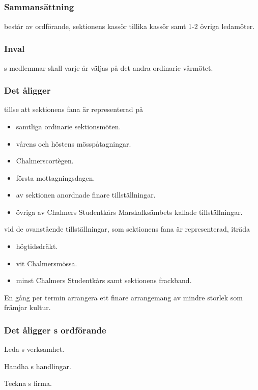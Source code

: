 \subsection{\FANBARERITFULL}
\subsubsection{Sammansättning}
\FANBARERIT{} består av ordförande, sektionens kassör tillika kassör samt 1-2 övriga ledamöter.

\subsubsection{Inval}
\FANBARERIT{}s medlemmar skall varje år väljas på det andra ordinarie vårmötet.

\subsubsection{Det åligger \FANBARERIT}
\label{sec:fanbarerit:function}
\begin{att}
	\item tillse att sektionens fana är representerad på
	\begin{itemize}
		\item samtliga ordinarie sektionsmöten.
		\item vårens och höstens mösspåtagningar.
		\item Chalmerscortègen.
		\item första mottagningsdagen.
		\item av sektionen anordnade finare tillställningar.
		\item övriga av Chalmers Studentkårs Marskalksämbets kallade tillställningar.
	\end{itemize}
	\item vid de ovanstående tillställningar, som sektionens fana är representerad, iträda
	\begin{itemize}
		\item högtidsdräkt.
		\item vit Chalmersmössa.
		\item minst Chalmers Studentkårs samt sektionens frackband.
	\end{itemize}
	\item En gång per termin arrangera ett finare arrangemang av mindre storlek som främjar kultur.
\end{att}

\subsubsection{Det åligger \FANBARERIT{}s ordförande}
\begin{att}
	\item Leda \FANBARERIT{}s verksamhet.
	\item Handha \FANBARERIT{}s handlingar.
	\item Teckna \FANBARERIT{}s firma.
\end{att}

